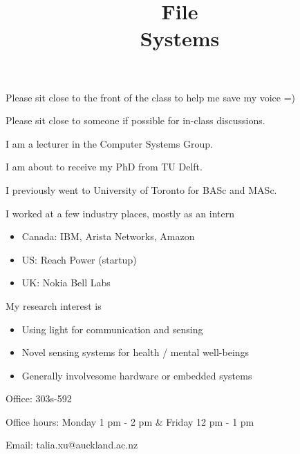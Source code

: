 

\title{File\\Systems}



\begin{slide}
	Please sit close to the front of the class to help me save my voice =)
	\bigskip
	
	Please sit close to someone if possible for in-class discussions.
\end{slide}

\begin{frame}
    \titlepage
\end{frame}

\begin{slide}

	
    I am a lecturer in the Computer Systems Group.
    \bigskip

    I am about to receive my PhD from TU Delft.
    \bigskip

   I previously went to University of Toronto for BASc and MASc.

\end{slide}

\begin{slide}


    I worked at a few industry places, mostly as an intern 
    \begin{itemize}
    	\item Canada: IBM, Arista Networks, Amazon
	\item US: Reach Power (startup)
	\item UK: Nokia Bell Labs
    \end{itemize}

    \bigskip
    My research interest is 
    \begin{itemize}
	\item Using light for communication and sensing
	\item Novel sensing systems for health / mental well-beings
	\item Generally involvesome hardware or embedded systems
    \end{itemize}

\end{slide}

\begin{slide}


    Office: 303s-592
    \bigskip

    Office hours: Monday 1 pm - 2 pm \& Friday 12 pm - 1 pm
    \bigskip

    Email: talia.xu@auckland.ac.nz

\end{slide}

